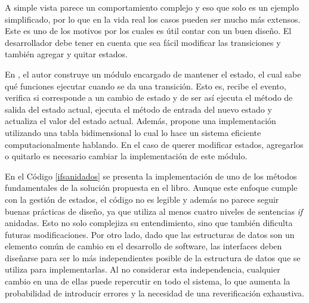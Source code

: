 A simple vista parece un comportamiento complejo y eso que solo es un ejemplo simplificado, por lo que en la vida real los casos pueden ser mucho más extensos. Este es uno de los motivos por los cuales es útil contar con un buen diseño. El desarrollador debe tener en cuenta que sea fácil modificar las transiciones y también agregar y quitar estados.

En \cite{douglass}, el autor construye un módulo encargado de mantener el estado, el cual sabe qué funciones ejecutar cuando se da una transición. Esto es, recibe el evento, verifica si corresponde a un cambio de estado y de ser así ejecuta el método de salida del estado actual, ejecuta el método de entrada del nuevo estado y actualiza el valor del estado actual. Además, propone una implementación utilizando una tabla bidimensional lo cual lo hace un sistema eficiente computacionalmente hablando. En el caso de querer modificar estados, agregarlos o quitarlo es necesario cambiar la implementación de este módulo. 


En el Código \ref{ifsanidados} se presenta la implementación de uno de los métodos fundamentales de la solución propuesta en el libro. Aunque este enfoque cumple con la gestión de estados, el código no es legible y además no parece seguir buenas prácticas de diseño, ya que utiliza al menos cuatro niveles de sentencias \textit{if} anidadas. Esto no solo complejiza su entendimiento, sino que también dificulta futuras modificaciones. Por otro lado, dado que las estructuras de datos son un elemento común de cambio en el desarrollo de software, las interfaces deben diseñarse para ser lo más independientes posible de la estructura de datos que se utiliza para implementarlas. Al no considerar esta independencia, cualquier cambio en una de ellas puede repercutir en todo el sistema, lo que aumenta la probabilidad de introducir errores y la necesidad de una reverificación exhaustiva.

\newpage

